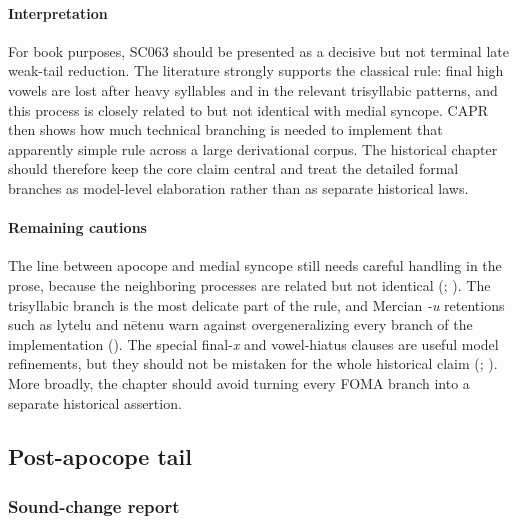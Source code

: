 \documentclass[
  british,
  a4paper,
]{article}
\begin{document}
\paragraph{Interpretation}\label{interpretation-40}

For book purposes, SC063 should be presented as a decisive but not
terminal late weak-tail reduction. The literature strongly supports the
classical rule: final high vowels are lost after heavy syllables and in
the relevant trisyllabic patterns, and this process is closely related
to but not identical with medial syncope. CAPR then shows how much
technical branching is needed to implement that apparently simple rule
across a large derivational corpus. The historical chapter should
therefore keep the core claim central and treat the detailed formal
branches as model-level elaboration rather than as separate historical
laws.

\paragraph{Remaining cautions}\label{remaining-cautions-40}

The line between apocope and medial syncope still needs careful handling
in the prose, because the neighboring processes are related but not
identical (;
). The
trisyllabic branch is the most delicate part of the rule, and Mercian
\emph{-u} retentions such as lytelu and nētenu warn against
overgeneralizing every branch of the implementation
(). The special
final-\emph{x} and vowel-hiatus clauses are useful model refinements,
but they should not be mistaken for the whole historical claim
(;
).
More broadly, the chapter should avoid turning every FOMA branch into a
separate historical assertion.

\subsection{Post-apocope tail}\label{post-apocope-tail}

\subsubsection{Sound-change report}\label{sound-change-report-41}
\end{document}
